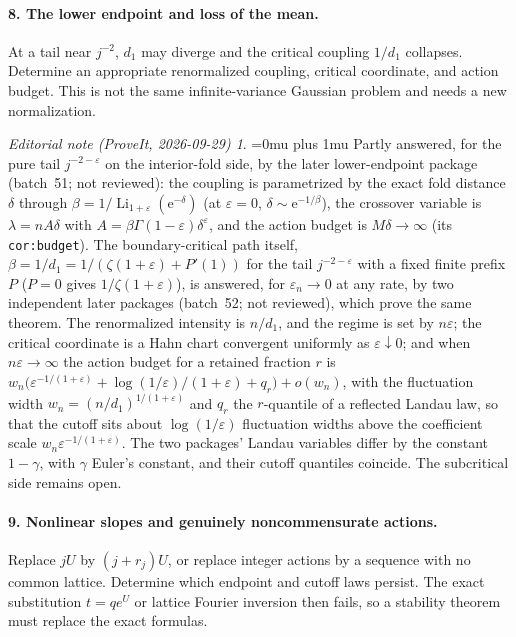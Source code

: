 \documentclass[11pt,a4paper]{article}
\numberwithin{equation}{section}
\theoremstyle{definition}
\theoremstyle{remark}
\newtheorem*{ednoteinner}{Editorial note (ProveIt, 2026-09-29)}
\newenvironment{ednote}{\begin{ednoteinner}\sloppy\Urlmuskip=0mu plus 1mu\relax}{\end{ednoteinner}}
\DeclareMathOperator{\Li}{Li}
\newcommand{\eps}{\varepsilon}
\begin{document}
\paragraph{8. The lower endpoint and loss of the mean.}
At a tail near $j^{-2}$, $d_1$ may diverge and the critical coupling
$1/d_1$ collapses. Determine an appropriate renormalized coupling,
critical coordinate, and action budget. This is not the same
infinite-variance Gaussian problem and needs a new normalization.
\begin{ednote}
Partly answered, for the pure tail $j^{-2-\eps}$ on the interior-fold side,
by the later lower-endpoint package \cite{ed:lcl} (batch~51; not reviewed):
the coupling is parametrized by the exact fold distance $\delta$ through
$\beta=1/\Li_{1+\eps}(\mathrm e^{-\delta})$ (at $\eps=0$,
$\delta\sim\mathrm e^{-1/\beta}$), the crossover variable is
$\lambda=nA\delta$ with $A=\beta\Gamma(1-\eps)\delta^{\eps}$, and the
action budget is $M\delta\to\infty$ (its \texttt{cor:budget}). The
boundary-critical path itself, $\beta=1/d_1=1/(\zeta(1+\eps)+P'(1))$ for
the tail $j^{-2-\eps}$ with a fixed finite prefix $P$ ($P=0$ gives
$1/\zeta(1+\eps)$), is answered, for $\eps_n\to0$ at any rate, by two
independent later packages \cite{ed:lcc,ed:lcu} (batch~52; not reviewed),
which prove the same theorem. The renormalized intensity is $n/d_1$, and
the regime is set by $n\eps$; the critical coordinate is a Hahn chart
convergent uniformly as $\eps\downarrow0$; and when $n\eps\to\infty$ the
action budget for a retained fraction $r$ is
$w_n\bigl(\eps^{-1/(1+\eps)}+\log(1/\eps)/(1+\eps)+q_r\bigr)+o(w_n)$,
with the fluctuation width $w_n=(n/d_1)^{1/(1+\eps)}$ and $q_r$ the
$r$-quantile of a reflected Landau law, so that the cutoff sits about
$\log(1/\eps)$ fluctuation widths above the coefficient scale
$w_n\eps^{-1/(1+\eps)}$. The
two packages' Landau variables differ by the constant $1-\gamma$, with
$\gamma$ Euler's constant, and their cutoff quantiles coincide. The
subcritical side remains open.
\end{ednote}

\paragraph{9. Nonlinear slopes and genuinely noncommensurate actions.}
Replace $jU$ by $(j+r_j)U$, or replace integer actions by a sequence
with no common lattice. Determine which endpoint and cutoff laws
persist. The exact substitution $t=qe^U$ or lattice Fourier inversion
then fails, so a stability theorem must replace the exact formulas.
\end{document}
